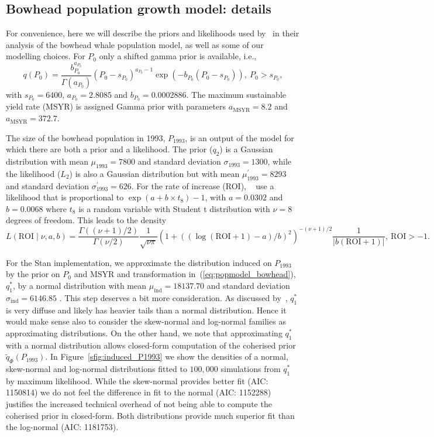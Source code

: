 \documentclass[a4paper, notitlepage, 10pt]{article}
\begin{document}
\subsection{Bowhead population growth model: details}

For convenience, here we will describe the priors and likelihoods used by~\cite{poole2000} in their analysis of the bowhead whale population model, as well as some of our modelling choices.
For $P_0$ only a shifted gamma prior is available, i.e.,
\begin{equation*}
 q(P_0) = \frac{b_{P_0}^{a_{P_0}}}{\Gamma(a_{P_0})} (P_0 - s_{P_0})^{a_{P_0}-1} \exp\left(-b_{P_0}(P_0 - s_{P_0})\right), \: P_0 > s_{P_0},
\end{equation*}
with $s_{P_0} = 6400$, $a_{P_0} = 2.8085$ and $b_{P_0} = 0.0002886$.
The maximum sustainable yield rate (MSYR) is assigned Gamma prior with parameters $a_{\text{MSYR}} = 8.2$ and $a_{\text{MSYR}} = 372.7$.

The size of the bowhead population in 1993, $P_{1993}$, is an output of the model for which there are both a prior and a likelihood.
The prior ($q_2$) is a Gaussian distribution with mean $\mu_{1993} = 7800$ and standard deviation $\sigma_{1993} = 1300$, while the likelihood ($L_2$) is also a Gaussian distribution but with mean $\mu_{1993}^\prime = 8293$ and standard deviation $\sigma_{1993}^\prime = 626$.
For the rate of increase (ROI), ~\cite{poole2000} use a likelihood that is proportional to  $\exp(a + b \times t_8) - 1$, with $a = 0.0302$ and $b = 0.0068$ where $t_8$ is a random variable with Student t distribution with $\nu = 8$ degrees of freedom.
This leads to the density
\begin{equation*}
 L(\text{ROI} \mid \nu, a, b) = \frac{\Gamma((\nu + 1)/2)}{\Gamma(\nu/2)}\frac{1}{\sqrt{\nu\pi}} \left( 1 + \left((\log(\text{ROI} + 1) - a)/b\right)^2 \right)^{-(\nu+ 1)/2}\frac{1}{|b(\text{ROI} + 1)|},\: \text{ROI} > -1.
\end{equation*}

For the Stan implementation, we approximate the distribution induced on $P_{1993}$ by the prior on $P_0$ and $\text{MSYR}$ and transformation in~(\ref{eq:popmodel_bowhead}), $q_1^\ast$,  by a normal distribution with mean $\mu_{\text{ind}} = 18137.70$ and standard deviation $\sigma_{\text{ind}} = 6146.85$ .
This step deserves a bit more consideration.
As discussed by~\cite{poole2000}, $q_1^\ast$ is very diffuse and likely has heavier tails than a normal distribution.
Hence it would make sense also to consider the skew-normal and log-normal families as approximating distributions.
On the other hand, we note that approximating $q_1^\ast$ with a normal distribution allows closed-form computation of the coherised prior $\tilde{q}_{\Phi}(P_{1993})$.
In Figure~\ref{sfig:induced_P1993} we show the densities of a normal, skew-normal and log-normal distributions fitted to $100, 000$ simulations from $q_1^\ast$ by maximum likelihood.
While the skew-normal provides better fit (AIC: 1150814) we do not feel the difference in fit to the normal (AIC: 1152288) justifies the increased technical overhead of not being able to compute the coherised prior in closed-form.
Both distributions provide much superior fit than the log-normal (AIC: 1181753).
\end{document}

